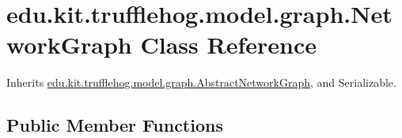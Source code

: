 \hypertarget{classedu_1_1kit_1_1trufflehog_1_1model_1_1graph_1_1_network_graph}{}\section{edu.\+kit.\+trufflehog.\+model.\+graph.\+Network\+Graph Class Reference}
\label{classedu_1_1kit_1_1trufflehog_1_1model_1_1graph_1_1_network_graph}


Inherits \hyperlink{classedu_1_1kit_1_1trufflehog_1_1model_1_1graph_1_1_abstract_network_graph}{edu.\+kit.\+trufflehog.\+model.\+graph.\+Abstract\+Network\+Graph}, and Serializable.

\subsection*{Public Member Functions}
